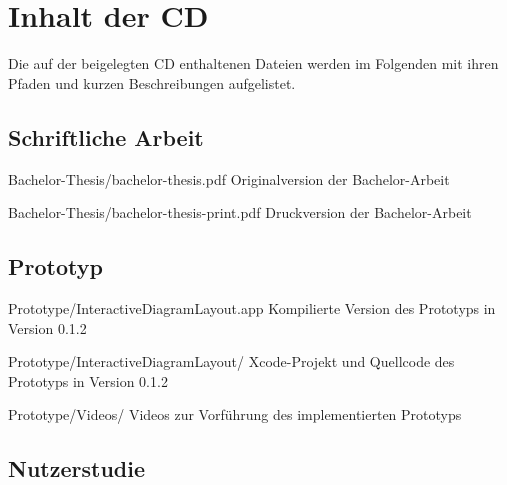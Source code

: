 
\chapter{Inhalt der CD}
\label{chapter:cd-content}

Die auf der beigelegten CD enthaltenen Dateien werden im Folgenden mit ihren Pfaden und kurzen Beschreibungen aufgelistet.

\newenvironment{fileslist}{
    \renewcommand\descriptionlabel[1]{\texttt{##1}}
    \setlength{\leftmargini}{0em}
    \begin{description}[style=nextline]
}{
    \end{description}
}

\section{Schriftliche Arbeit}

\begin{fileslist}

\item[Bachelor-Thesis/bachelor-thesis.pdf] 
Originalversion der Bachelor-Arbeit

\item[Bachelor-Thesis/bachelor-thesis-print.pdf] 
Druckversion der Bachelor-Arbeit

\end{fileslist}

\section{Prototyp}

\begin{fileslist}

\item[Prototype/InteractiveDiagramLayout.app]
Kompilierte Version des Prototyps in Version 0.1.2

\item[Prototype/InteractiveDiagramLayout/] 
Xcode-Projekt und Quellcode des Prototyps in Version 0.1.2

\item[Prototype/Videos/] 
Videos zur Vorführung des implementierten Prototyps

\end{fileslist}

\section{Nutzerstudie}
\label{sec:files-user-study}

